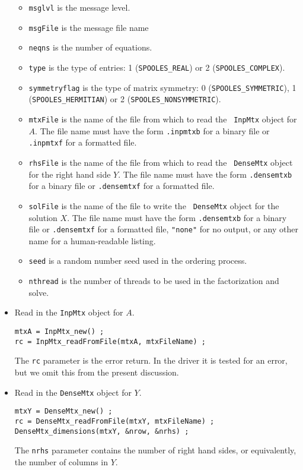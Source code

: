 \begin{itemize}
\begin{itemize}
\item {\tt msglvl} is the message level.
\item {\tt msgFile} is the message file name
\item {\tt neqns} is the number of equations.
\item {\tt type} is the type of entries:
1 ({\tt SPOOLES\_REAL}) or
2 ({\tt SPOOLES\_COMPLEX}).
\item {\tt symmetryflag} is the type of matrix symmetry:
0 ({\tt SPOOLES\_SYMMETRIC}),
1 ({\tt SPOOLES\_HERMITIAN}) or
2 ({\tt SPOOLES\_NONSYMMETRIC}).
\item {\tt mtxFile} is the name of the file from which to read the {\tt
InpMtx} object for $A$.
The file name must have the form {\tt *.inpmtxb} for a binary file or
{\tt *.inpmtxf} for a formatted file.
\item {\tt rhsFile} is the name of the file from which to read the {\tt
DenseMtx} object for the right hand side $Y$.
The file name must have the form {\tt *.densemtxb} for a binary file or
{\tt *.densemtxf} for a formatted file.
\item {\tt solFile} is the name of the file to write the {\tt
DenseMtx} object for the solution $X$.
The file name must have the form {\tt *.densemtxb} for a binary file or
{\tt *.densemtxf} for a formatted file, {\tt "none"} for no output,
or any other name for a human-readable listing.
\item {\tt seed} is a random number seed used in the ordering process.
\item {\tt nthread} is the number of threads to be used in the
factorization and solve.
\end{itemize}
%
\item Read in the {\tt InpMtx} object for $A$.
\begin{verbatim}
mtxA = InpMtx_new() ;
rc = InpMtx_readFromFile(mtxA, mtxFileName) ;
\end{verbatim}
The {\tt rc} parameter is the error return. 
In the driver it is tested for an error, but we omit this from the
present discussion.
%
\item Read in the {\tt DenseMtx} object for $Y$.
\begin{verbatim}
mtxY = DenseMtx_new() ;
rc = DenseMtx_readFromFile(mtxY, mtxFileName) ;
DenseMtx_dimensions(mtxY, &nrow, &nrhs) ;
\end{verbatim}
The {\tt nrhs} parameter contains the number of right hand sides,
or equivalently, the number of columns in $Y$.

\end{itemize}
